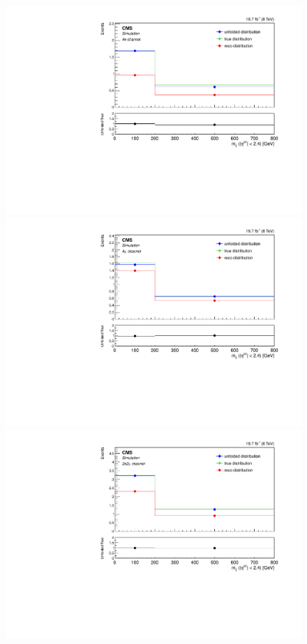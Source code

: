 \begin{figure}[hbtp]
\begin{center}
    \includegraphics[width=0.8\cmsFigWidth]{Figures/Unfolding/MCTests/CentralMjj_ZZTo4e_PowMatrix_PowDistr_HalfSample_fr}     
    \includegraphics[width=0.8\cmsFigWidth]{Figures/Unfolding/MCTests/CentralMjj_ZZTo4m_PowMatrix_PowDistr_HalfSample_fr}     
 \includegraphics[width=0.8\cmsFigWidth]{Figures/Unfolding/MCTests/CentralMjj_ZZTo2e2m_PowMatrix_PowDistr_HalfSample_fr}        

\end{center}
\end{figure}
